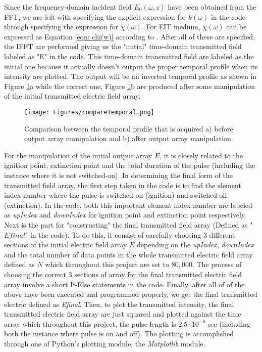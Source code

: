 Since the frequency-domain incident field $E_{0}(\omega, z)$ have been obtained from the FFT, we are left with specifying the explicit expression for $k(\omega)$ in the code through specifying the expression for $\chi(\omega)$. For EIT medium, $\chi(\omega)$ can be expressed as Equation \ref{eqn: chi(w)} according to \cite{Jeong2009, Braje2004}. After all of these are specified, the IFFT are performed giving us the "initial" time-domain transmitted field labeled as "E" in the code. This time-domain transmitted field are labeled as the initial one because it actually doesn't output the proper temporal profile when its intensity are plotted. The output will be an inverted temporal profile as shown in Figure \ref{fig: compare temporal}a while the correct one, Figure \ref{fig: compare temporal}b are produced after some manipulation of the initial transmitted electric field array.

\begin{figure}[h!]
    \centering
    \texttt{[image: Figures/compareTemporal.png]}
    \caption{Comparison between the temporal profile that is acquired a) before output array manipulation and b) after output array manipulation.}
    \label{fig: compare temporal}
\end{figure}

For the manipulation of the initial output array $E$, it is closely related to the ignition point, extinction point and the total duration of the pulse (including the instance where it is not switched-on). In determining the final form of the transmitted field array, the first step taken in the code is to find the element index number where the pulse is switched on (ignition) and switched off (extinction). In the code, both this important element index number are labeled as \textit{upIndex} and \textit{downIndex} for ignition point and extinction point respectively. Next is the part for "constructing" the final transmitted field array (Defined as "$Efinal$" in the code). To do this, it consist of carefully choosing 3 different sections of the initial electric field array $E$ depending on the \textit{upIndex}, \textit{downIndex} and the total number of data points in the whole transmitted electric field array defined as $N$ which throughout this project are set to $80,000$. The process of choosing the correct 3 sections of array for the final transmitted electric field array involve a short If-Else statements in the code. Finally, after all of of the above have been executed and programmed properly, we get the final transmitted electric defined as \textit{Efinal}. Then, to plot the transmitted intensity, the final transmitted electric field array are just squared and plotted against the time array which throughout this project, the pulse length is $2.5 \cdot 10^{-6}$ sec (including both the instance where pulse is on and off). The plotting is accomplished through one of Python's plotting module, the \textit{Matplotlib} module.

